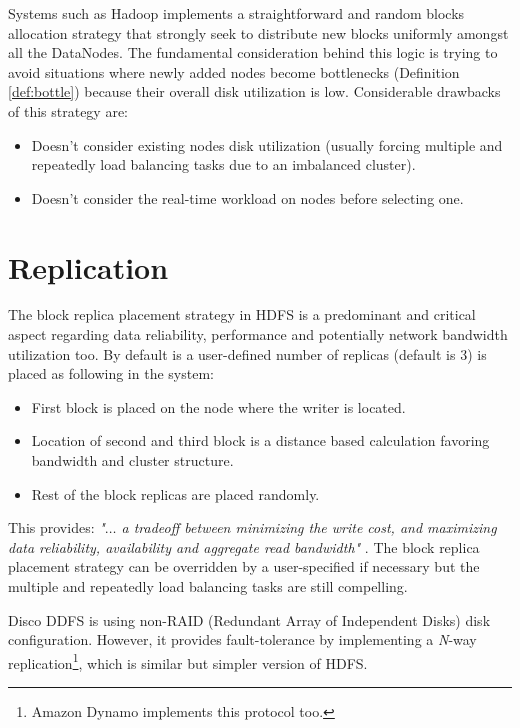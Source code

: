 Systems such as Hadoop implements a straightforward and random blocks allocation strategy that strongly seek to distribute new blocks uniformly amongst all the DataNodes. The fundamental consideration behind this logic is trying to avoid situations where newly added nodes become bottlenecks (Definition \ref{def:bottle}) because their overall disk utilization is low. Considerable drawbacks of this strategy are:

\begin{itemize}
	\item Doesn’t consider existing nodes disk utilization (usually forcing multiple and repeatedly load balancing tasks due to an imbalanced cluster).
	\item Doesn't consider the real-time workload on nodes before selecting one.
\end{itemize}

\section{Replication} \label{sec:replication}
The block replica placement strategy in HDFS is a predominant and critical aspect regarding data reliability, performance and potentially network bandwidth utilization too. By default is a user-defined number of replicas (default is 3) is placed as following in the system:
\begin{itemize}
	\item First block is placed on the node where the writer is located.
	\item Location of second and third block is a distance based calculation favoring bandwidth and cluster structure.
	\item Rest of the block replicas are placed randomly. 
\end{itemize}

This provides: \textit{"$\ldots$ a tradeoff between minimizing the write cost, and maximizing data reliability, availability and aggregate read bandwidth"} \cite{Shvachko:2010:HDF:1913798.1914427}. The block replica placement strategy can be overridden by a user-specified if necessary but the multiple and repeatedly load balancing tasks are still compelling.

Disco DDFS is using non-RAID (Redundant Array of Independent Disks) disk configuration. However, it provides fault-tolerance by implementing a \textit{N}-way replication\footnote{Amazon Dynamo \cite{DeCandia:2007:DAH:1294261.1294281} implements this protocol too.}, which is similar but simpler version of HDFS.

